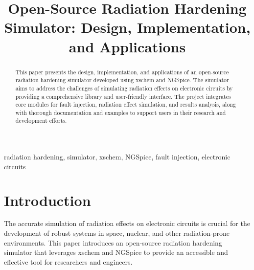 \documentclass[conference]{IEEEtran}
\begin{document}
\title{Open-Source Radiation Hardening Simulator: Design, Implementation, and Applications}

\author{
\and
{}
\and
{}
\and
{}
}

\maketitle

\begin{abstract}
This paper presents the design, implementation, and applications of an open-source radiation hardening simulator developed using xschem and NGSpice. The simulator aims to address the challenges of simulating radiation effects on electronic circuits by providing a comprehensive library and user-friendly interface. The project integrates core modules for fault injection, radiation effect simulation, and results analysis, along with thorough documentation and examples to support users in their research and development efforts.
\end{abstract}

\begin{IEEEkeywords}
radiation hardening, simulator, xschem, NGSpice, fault injection, electronic circuits
\end{IEEEkeywords}

\section{Introduction}
The accurate simulation of radiation effects on electronic circuits is crucial for the development of robust systems in space, nuclear, and other radiation-prone environments. This paper introduces an open-source radiation hardening simulator that leverages xschem and NGSpice to provide an accessible and effective tool for researchers and engineers.
\end{document}
